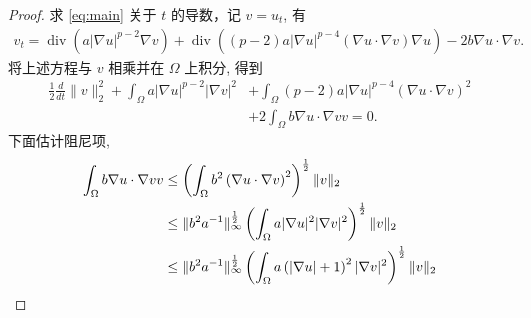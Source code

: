 \documentclass[twoside,longtitle]{LZUthesis}
\theoremstyle{definition}
\newtheorem{proofpart}{part}
\numberwithin{equation}{chapter}
\newcommand*\abs[1]{\lvert#1\rvert}
\newcommand*\norm[1]{\lVert#1\rVert}
\newcommand*\Brace[1]{\lbrace#1\rbrace}
\newcommand\R{\mathbb{R}}
\DeclareMathOperator{\Div}{div}
\begin{document}
\begin{proof}
	求 \cref{eq:main} 关于 $t$ 的导数，记 $v = u_t$, 有
	\begin{equation}
		\begin{split}
			v_t
			= \Div\left(a\abs{\nabla u}^{p-2}\nabla v\right)
			+ \Div\left(\left(p-2\right)a \abs{\nabla u}^{p-4}\left(\nabla u \cdot \nabla v\right)\nabla u\right)
			- 2b\nabla u \cdot \nabla v.
		\end{split}
	\end{equation}
	将上述方程与 $v$ 相乘并在 $\Omega$ 上积分, 得到
	\begin{equation}
		\begin{split}
			\frac{1}{2}\frac{d}{dt}\norm{v}_2^2
			+ \int_{\Omega}a\abs{\nabla u}^{p-2}\abs{\nabla v}^2
			&+ \int_{\Omega}\left(p-2\right)a\abs{\nabla u}^{p-4}\left(\nabla u
			\cdot \nabla v\right)^2\\
			&+ 2\int_{\Omega}b\nabla u \cdot \nabla v v
			= 0.
		\end{split}
	\end{equation}
	下面估计阻尼项,
	\begin{equation}
		\begin{split}
			\int_{\Omega}b\nabla u \cdot \nabla v v
			&\leq \left(\int_{\Omega}b^2\left(\nabla u
			\cdot \nabla v\right)^2\right)^{\frac{1}{2}}
			\*\norm{v}_2\\
			&\leq \norm{b^2 a^{-1}}_{\infty}^{\frac{1}{2}}
			\left(\int_{\Omega}a\abs{\nabla u}^2\abs{\nabla v}^2\right)^{\frac{1}{2}}\norm{v}_2\\
			&\leq \norm{b^2 a^{-1}}_{\infty}^{\frac{1}{2}}
			\left(\int_{\Omega}a\left(\abs{\nabla u}+1\right)^2\abs{\nabla v}^2\right)^{\frac{1}{2}}\norm{v}_2\\

\end{split}
\end{equation}
\end{proof}
\end{document}
